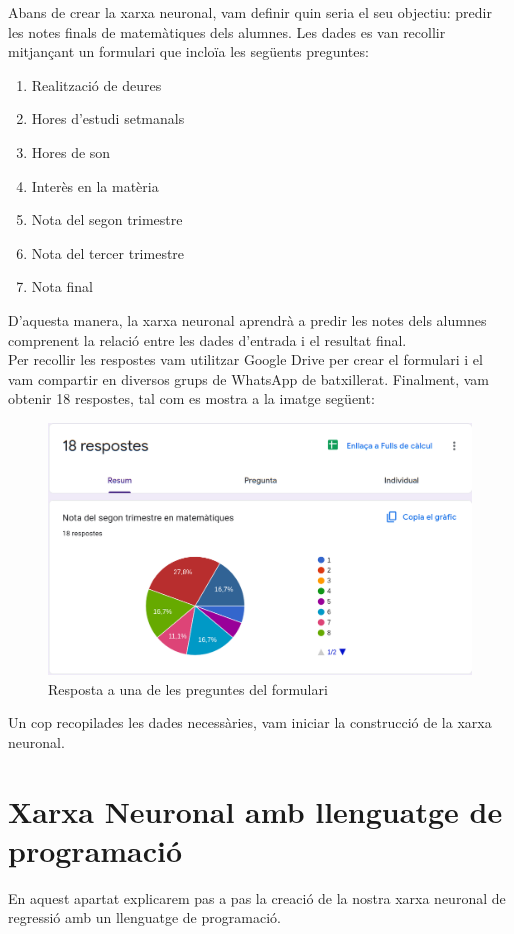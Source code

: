 Abans de crear la xarxa neuronal, vam definir quin seria el seu objectiu: predir les notes finals de matemàtiques dels alumnes. Les dades es van recollir mitjançant un formulari que incloïa les següents preguntes:

\begin{enumerate}
    \item Realització de deures
    \item Hores d’estudi setmanals
    \item Hores de son
    \item Interès en la matèria
    \item Nota del segon trimestre
    \item Nota del tercer trimestre
    \item Nota final
\end{enumerate}

D’aquesta manera, la xarxa neuronal aprendrà a predir les notes dels alumnes comprenent la relació entre les dades d’entrada i el resultat final.\\[0.2cm]
Per recollir les respostes vam utilitzar Google Drive per crear el formulari i el vam compartir en diversos grups de WhatsApp de batxillerat. Finalment, vam obtenir 18 respostes, tal com es mostra a la imatge següent:

\begin{figure}[h!]
\centering
\includegraphics[width=1\textwidth]{./figures/Formulari.png}
\caption{Resposta a una de les preguntes del formulari}
\end{figure}

Un cop recopilades les dades necessàries, vam iniciar la construcció de la xarxa neuronal.

\section{Xarxa Neuronal amb llenguatge de programació}\label{sec:10}
En aquest apartat explicarem pas a pas la creació de la nostra xarxa neuronal de regressió amb un llenguatge de programació.

